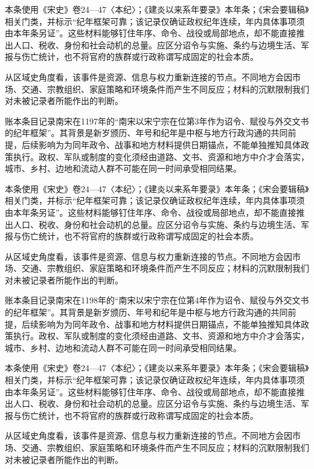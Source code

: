 本条使用《宋史》卷24—47〈本纪〉；《建炎以来系年要录》本年条；《宋会要辑稿》相关门类，并标示“纪年框架可靠；该记录仅确证政权纪年连续，年内具体事项须由本年条另证”。这些材料能够钉住年序、命令、战役或局部地点，却不能直接推出人口、税收、身份和社会动机的总量。应区分诏令与实施、条约与边境生活、军报与伤亡统计，也不将官府的族群或行政称谓写成固定的社会本质。

从区域史角度看，该事件是资源、信息与权力重新连接的节点。不同地方会因市场、交通、宗教组织、家庭策略和环境条件而产生不同反应；材料的沉默限制我们对未被记录者所能作出的判断。

账本条目记录南宋在1197年的“南宋以宋宁宗在位第3年作为诏令、赋役与外交文书的纪年框架”。其背景是新岁颁历、年号和纪年是中枢与地方行政沟通的共同前提，后续影响为为同年政令、战事和地方材料提供日期锚点，不能单独推知具体政策执行。政权、军队或制度的变化须经由道路、文书、资源和地方中介才会落实，城市、乡村、边地和流动人群不可能在同一时间承受相同结果。

本条使用《宋史》卷24—47〈本纪〉；《建炎以来系年要录》本年条；《宋会要辑稿》相关门类，并标示“纪年框架可靠；该记录仅确证政权纪年连续，年内具体事项须由本年条另证”。这些材料能够钉住年序、命令、战役或局部地点，却不能直接推出人口、税收、身份和社会动机的总量。应区分诏令与实施、条约与边境生活、军报与伤亡统计，也不将官府的族群或行政称谓写成固定的社会本质。

从区域史角度看，该事件是资源、信息与权力重新连接的节点。不同地方会因市场、交通、宗教组织、家庭策略和环境条件而产生不同反应；材料的沉默限制我们对未被记录者所能作出的判断。

账本条目记录南宋在1198年的“南宋以宋宁宗在位第4年作为诏令、赋役与外交文书的纪年框架”。其背景是新岁颁历、年号和纪年是中枢与地方行政沟通的共同前提，后续影响为为同年政令、战事和地方材料提供日期锚点，不能单独推知具体政策执行。政权、军队或制度的变化须经由道路、文书、资源和地方中介才会落实，城市、乡村、边地和流动人群不可能在同一时间承受相同结果。

本条使用《宋史》卷24—47〈本纪〉；《建炎以来系年要录》本年条；《宋会要辑稿》相关门类，并标示“纪年框架可靠；该记录仅确证政权纪年连续，年内具体事项须由本年条另证”。这些材料能够钉住年序、命令、战役或局部地点，却不能直接推出人口、税收、身份和社会动机的总量。应区分诏令与实施、条约与边境生活、军报与伤亡统计，也不将官府的族群或行政称谓写成固定的社会本质。

从区域史角度看，该事件是资源、信息与权力重新连接的节点。不同地方会因市场、交通、宗教组织、家庭策略和环境条件而产生不同反应；材料的沉默限制我们对未被记录者所能作出的判断。

